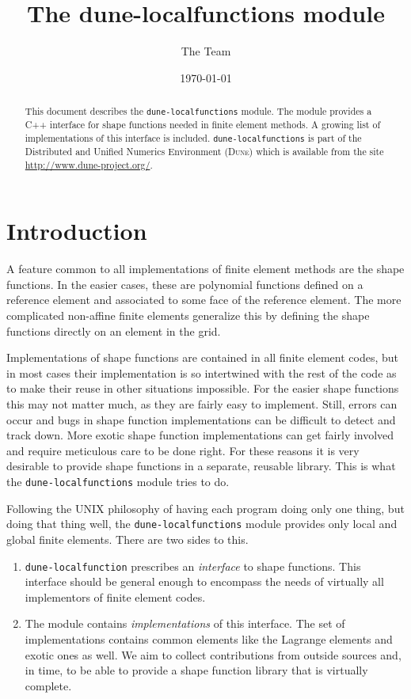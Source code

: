\documentclass[11pt]{article}
\title{The dune-localfunctions module}
\author{The \dune Team}
\date{\today}
\newcommand{\dune}{\textsc{Dune}\xspace}
\newcommand{\modulename}[1]{\texttt{#1}\xspace}
\begin{document}
\maketitle

\begin{abstract}
This document describes the \modulename{dune-localfunctions} module.
The module provides a C++ interface for shape functions needed in
finite element methods.  A growing list of implementations of this
interface is included. \modulename{dune-localfunctions}
is part of the Distributed and Unified Numerics Environment (\dune) which is
available from the site \url{http://www.dune-project.org/}.
\end{abstract}

\begin{multicols}{2}
{\small\tableofcontents}
\end{multicols}

\section{Introduction}

A feature common to all implementations of finite element methods are the
shape functions.  In the easier cases, these are polynomial functions
defined on a reference element and associated to some face of the reference
element.  The more complicated non-affine finite elements generalize this
by defining the shape functions directly on an element in the grid.

Implementations of shape functions are contained in all finite element codes,
but in most cases their implementation is so intertwined with the rest of
the code as to make their reuse in other situations impossible.
For the easier shape functions this may not matter much, as they are
fairly easy to implement.  Still, errors can occur and bugs in shape function
implementations can be difficult to detect and track down.
More exotic shape function implementations can get fairly involved
and require meticulous care to be done right.  For these reasons it is
very desirable to provide shape functions in a separate, reusable library.
This is what the \modulename{dune-localfunctions} module tries to do.


Following the UNIX philosophy of having each program doing only one thing,
but doing that thing well, the \modulename{dune-localfunctions} module
provides only local and global finite elements.  There are two sides to this.
\begin{enumerate}
 \item \modulename{dune-localfunction} prescribes an {\em interface} to shape functions.
  This interface
  should be general enough to encompass the needs of virtually all implementors
  of finite element codes.
 \item The module contains {\em implementations} of this interface.  The set
  of implementations contains common elements like the Lagrange elements and
  exotic ones as well.  We aim to collect contributions from outside sources
  and, in time, to be able to provide a shape function library that is virtually
  complete.
\end{enumerate}
\end{document}
